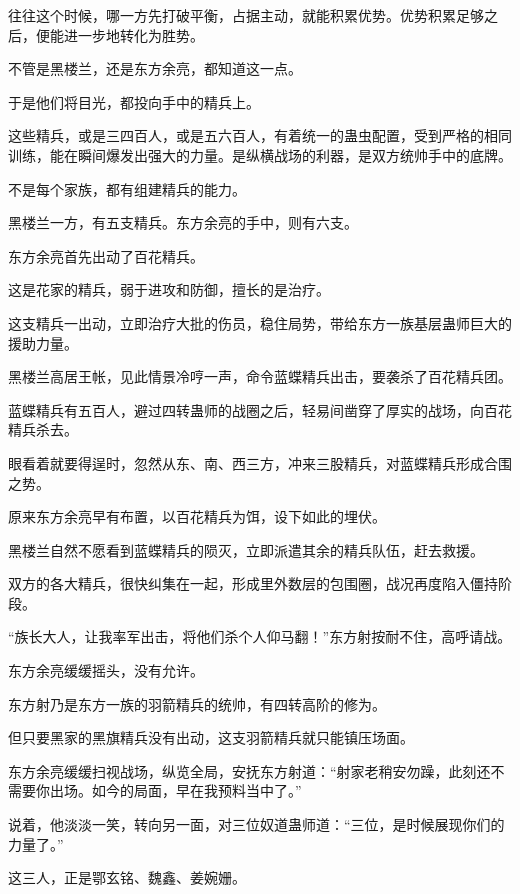 \begin{this_body}
往往这个时候，哪一方先打破平衡，占据主动，就能积累优势。优势积累足够之后，便能进一步地转化为胜势。

不管是黑楼兰，还是东方余亮，都知道这一点。

于是他们将目光，都投向手中的精兵上。

这些精兵，或是三四百人，或是五六百人，有着统一的蛊虫配置，受到严格的相同训练，能在瞬间爆发出强大的力量。是纵横战场的利器，是双方统帅手中的底牌。

不是每个家族，都有组建精兵的能力。

黑楼兰一方，有五支精兵。东方余亮的手中，则有六支。

东方余亮首先出动了百花精兵。

这是花家的精兵，弱于进攻和防御，擅长的是治疗。

这支精兵一出动，立即治疗大批的伤员，稳住局势，带给东方一族基层蛊师巨大的援助力量。

黑楼兰高居王帐，见此情景冷哼一声，命令蓝蝶精兵出击，要袭杀了百花精兵团。

蓝蝶精兵有五百人，避过四转蛊师的战圈之后，轻易间凿穿了厚实的战场，向百花精兵杀去。

眼看着就要得逞时，忽然从东、南、西三方，冲来三股精兵，对蓝蝶精兵形成合围之势。

原来东方余亮早有布置，以百花精兵为饵，设下如此的埋伏。

黑楼兰自然不愿看到蓝蝶精兵的陨灭，立即派遣其余的精兵队伍，赶去救援。

双方的各大精兵，很快纠集在一起，形成里外数层的包围圈，战况再度陷入僵持阶段。

“族长大人，让我率军出击，将他们杀个人仰马翻！”东方射按耐不住，高呼请战。

东方余亮缓缓摇头，没有允许。

东方射乃是东方一族的羽箭精兵的统帅，有四转高阶的修为。

但只要黑家的黑旗精兵没有出动，这支羽箭精兵就只能镇压场面。

东方余亮缓缓扫视战场，纵览全局，安抚东方射道：“射家老稍安勿躁，此刻还不需要你出场。如今的局面，早在我预料当中了。”

说着，他淡淡一笑，转向另一面，对三位奴道蛊师道：“三位，是时候展现你们的力量了。”

这三人，正是鄂玄铭、魏鑫、姜婉姗。

\end{this_body}

